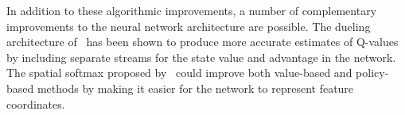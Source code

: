 In addition to these algorithmic improvements, a number of complementary improvements to the neural network architecture are possible.
The dueling architecture of~\cite{wang2015dueling} has been shown to produce more accurate estimates of Q-values by including separate streams for the state value and advantage in the network.
The spatial softmax proposed by~\cite{levine2015endtoend} could improve both value-based and policy-based methods by making it easier for the network to represent feature coordinates.
